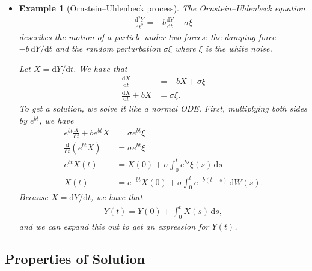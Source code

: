 \documentclass[10pt]{article}
\newtheorem{example}[lemma]{Example}
\newcommand{\dee}{\mathrm{d}}
\begin{document}
\begin{itemize}
  \item \begin{example}[Ornstein--Uhlenbeck process]
  The Ornstein--Uhlenbeck equation
  \begin{align*}
    \frac{\dee^2 Y}{\dee t^2} = -b \frac{\dee Y}{\dee t} + \sigma \xi
  \end{align*}
  describes the motion of a particle under two forces: the damping force $-b\, \dee Y / \dee t$ and the random perturbation $\sigma \xi$ where $\xi$ is the white noise.

  Let $X = \dee Y / \dee t$. We have that
  \begin{align*}
    \frac{\dee X}{\dee t} &= -b X + \sigma \xi \\
    \frac{\dee X}{\dee t} + bX &=  \sigma \xi.
  \end{align*}
  To get a solution, we solve it like a normal ODE. First, multiplying both sides by $e^{bt}$, we have
  \begin{align*}
    e^{bt} \frac{X}{\dee t} + b e^{bt} X &= \sigma e^{bt} \xi \\
    \frac{\dee}{\dee t} (e^{bt} X) &= \sigma e^{bt} \xi \\
    e^{bt} X(t) &= X(0) + \sigma \int_0^t e^{bs} \xi(s)\, \dee s \\
    X(t) &= e^{-bt} X(0) + \sigma \int_0^t e^{-b(t-s)}\, \dee W(s).
  \end{align*}
  Because $X = \dee Y / \dee t$, we have that
  \begin{align*}
    Y(t) = Y(0) + \int_0^t X(s)\, \dee s,
  \end{align*}
  and we can expand this out to get an expression for $Y(t)$.
  
  \end{example}
\end{itemize}

\subsection{Properties of Solution}
\end{document}
